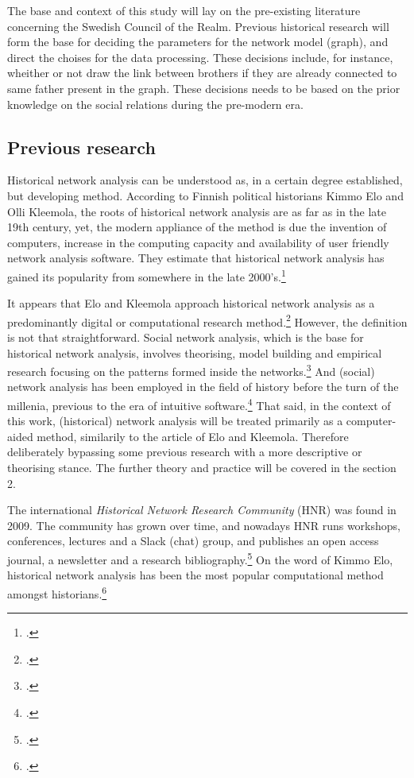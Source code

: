 \documentclass[a4paper,12pt]{article}
\begin{document}
\begin{onehalfspace}
The base and context of this study will lay on the pre-existing literature concerning the Swedish Council of the Realm. Previous historical research will form the base for deciding the parameters for the network model (graph), and direct the choises for the data processing. These decisions include, for instance, wheither or not draw the link between brothers if they are already connected to same father present in the graph. These decisions needs to be based on the prior knowledge on the social relations during the pre-modern era. 

\subsection{Previous research}
Historical network analysis can be understood as, in a certain degree established, but developing method. According to Finnish political historians Kimmo Elo and Olli Kleemola, the roots of historical network analysis are as far as in the late 19th century, yet, the modern appliance of the method is due the invention of computers, increase in the computing capacity and availability of user friendly network analysis software. They estimate that historical network analysis has gained its popularity from somewhere in the late 2000's.\footcite[p. 415-417.]{eloAklee15} 

It appears that Elo and Kleemola approach historical network analysis as a predominantly digital or computational research method.\footcite[p. 415-417.]{eloAklee15} However, the definition is not that straightforward. Social network analysis, which is the base for historical network analysis, involves theorising, model building and empirical research focusing on the patterns formed inside the networks.\footcite[p. 22-24.]{Keats-R2007} And (social) network analysis has been employed in the field of history before the turn of the millenia, previous to the era of intuitive software.\footcite[TODO check!]{AronssonEtA1999} That said, in the context of this work, (historical) network analysis will be treated primarily as a computer-aided method, similarily to the article of Elo and Kleemola. Therefore deliberately bypassing some previous research with a more descriptive or theorising stance. The further theory and practice will be covered in the section 2.

The international \textit{Historical Network Research Community} (HNR) was found in 2009. The community has grown over time, and nowadays HNR runs workshops, conferences, lectures and a Slack (chat) group, and publishes an open access journal, a newsletter and a research bibliography.\footcite{hnr} On the word of Kimmo Elo, historical network analysis has been the most popular computational method amongst historians.\footcite[p. 22.]{elo16} 


\end{onehalfspace}
\end{document}
